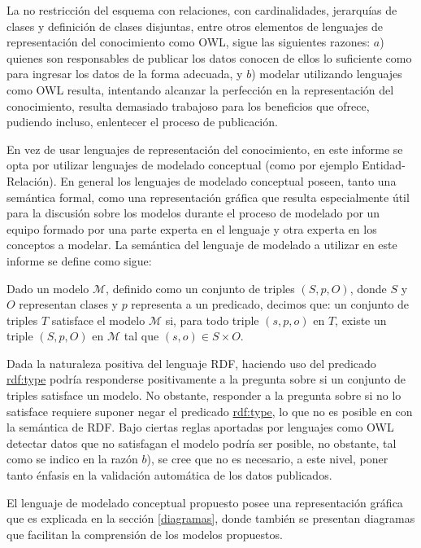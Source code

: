 \documentclass[letterpaper,titlepage]{article}
\begin{document}
La no restricción del esquema con relaciones, con cardinalidades,
jerarquías de clases y definición de clases disjuntas, entre otros
elementos de lenguajes de representación del conocimiento como OWL,
sigue las siguientes razones: $a$) quienes son responsables de publicar
los datos conocen de ellos lo suficiente como para ingresar los datos
de la forma adecuada, y $b$) modelar utilizando lenguajes como OWL
resulta, intentando alcanzar la perfección en la representación del
conocimiento, resulta demasiado trabajoso para los beneficios que
ofrece, pudiendo incluso, enlentecer el proceso de publicación.

En vez de usar lenguajes de representación del conocimiento, en este
informe se opta por utilizar lenguajes de modelado conceptual (como
por ejemplo Entidad-Relación). En general los lenguajes de modelado
conceptual poseen, tanto una semántica formal, como una representación
gráfica que resulta especialmente útil para la discusión sobre los
modelos durante el proceso de modelado por un equipo formado por
una parte experta en el lenguaje y otra experta en los conceptos a
modelar. La semántica del lenguaje de modelado a utilizar en este
informe se define como sigue: \medskip

 Dado un modelo $\mathcal{M}$, definido
como un conjunto de triples $(S,p,O)$, donde $S$ y $O$ representan
clases y $p$ representa a un predicado, decimos que: un conjunto de
triples $T$ satisface el modelo $\mathcal{M}$ si, para todo triple
$(s,p,o)$ en $T$, existe un triple $(S,p,O)$ en $\mathcal{M}$ tal que
$(s,o) \in S \times O$. \medskip

Dada la naturaleza positiva del lenguaje RDF, haciendo uso del
predicado \url{rdf:type} podría responderse positivamente a la
pregunta sobre si un conjunto de triples satisface un modelo. No
obstante, responder a la pregunta sobre si no lo satisface requiere
suponer negar el predicado \url{rdf:type}, lo que no es posible en
con la semántica de RDF. Bajo ciertas reglas aportadas por lenguajes
como OWL detectar datos que no satisfagan el modelo podría ser
posible, no obstante, tal como se indico en la razón $b$), se cree que
no es necesario, a este nivel, poner tanto énfasis en la validación
automática de los datos publicados.

El lenguaje de modelado conceptual propuesto posee una representación
gráfica que es explicada en la sección \ref{diagramas}, donde también
se presentan diagramas que facilitan la comprensión de los modelos
propuestos.
\end{document}
